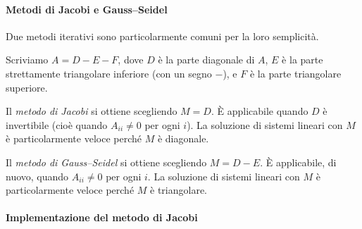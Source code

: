 \documentclass[a4paper]{report}
\theoremstyle{definiton}
\theoremstyle{remark}
\begin{document}

\paragraph{Metodi di Jacobi e Gauss--Seidel} Due metodi iterativi sono particolarmente comuni per la loro semplicità.

Scriviamo $A = D - E - F$, dove $D$ è la parte diagonale di $A$, $E$ è la parte strettamente triangolare inferiore (con un segno $-$), e $F$ è la parte triangolare superiore.

Il \emph{metodo di Jacobi} si ottiene scegliendo $M = D$. È applicabile quando $D$ è invertibile (cioè quando $A_{ii} \neq 0$ per ogni $i$). La soluzione di sistemi lineari con $M$ è particolarmente veloce perché $M$ è diagonale.

Il \emph{metodo di Gauss--Seidel} si ottiene scegliendo $M = D - E$. È applicabile, di nuovo, quando $A_{ii} \neq 0$ per ogni $i$. La soluzione di sistemi lineari con $M$ è particolarmente veloce perché $M$ è triangolare.

\paragraph{Implementazione del metodo di Jacobi}
\end{document}
